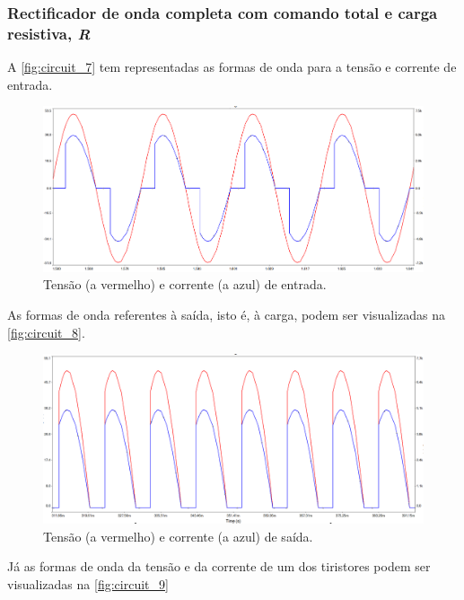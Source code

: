 \documentclass[a4paper,11pt]{article}
\numberwithin{equation}{section}
\begin{document}
\subsubsection{Rectificador de onda completa com comando total e carga resistiva, \textit{R}}

A \autoref{fig:circuit_7} tem representadas as formas de onda para a tensão e corrente de entrada.

\begin{figure}[h]
	\centering
	\includegraphics[keepaspectratio=true, scale=0.4]{img/circuito5}
	\caption{Tensão (a vermelho) e corrente (a azul) de entrada.}
	\label{fig:circuit_7}
	\vspace{-0.8em}
\end{figure}

\pagebreak
As formas de onda referentes à saída, isto é, à carga, podem ser visualizadas na \autoref{fig:circuit_8}.

\begin{figure}[h]
	\centering
	\includegraphics[keepaspectratio=true, scale=0.4]{img/circuito6}
	\caption{Tensão (a vermelho) e corrente (a azul) de saída.}
	\label{fig:circuit_8}
	\vspace{-0.8em}
\end{figure}

Já as formas de onda da tensão e da corrente de um dos tiristores podem ser visualizadas na \autoref{fig:circuit_9}
\end{document}
